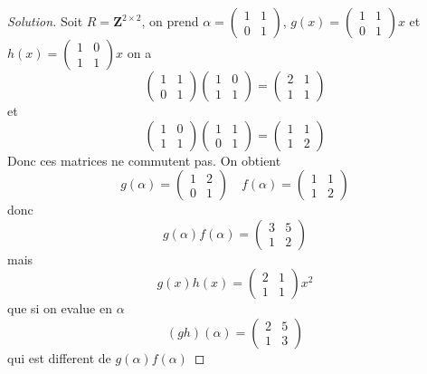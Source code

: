 \documentclass[a4paper,11pt,french]{report}
\theoremstyle{plain}
\theoremstyle{definition}
\begin{document}
\begin{proof}[Solution]
Soit $R=\mathbf{Z}^{2\times2}$, on prend $\alpha=\begin{pmatrix}1 & 1 \\ 0 & 1\end{pmatrix}$, $g(x)=\begin{pmatrix}1 & 1  \\ 0 & 1 \end{pmatrix}x$ et $h(x)=\begin{pmatrix} 1 & 0 \\ 1 & 1\end{pmatrix}x$ on a
$$
\begin{pmatrix}
1 & 1 \\
0 & 1
\end{pmatrix}\begin{pmatrix}
1 & 0 \\
1 & 1
\end{pmatrix}=\begin{pmatrix}
2 & 1 \\
1 & 1
\end{pmatrix}
$$
et 
$$
\begin{pmatrix}
1 & 0 \\
1 & 1
\end{pmatrix}\begin{pmatrix}
1 & 1 \\
0 & 1
\end{pmatrix}=\begin{pmatrix}
1 & 1 \\
1 & 2
\end{pmatrix}
$$
Donc ces matrices ne commutent pas. On obtient
$$
g(\alpha)=\begin{pmatrix}
1 & 2 \\
0 & 1
\end{pmatrix}\quad f(\alpha)=\begin{pmatrix}
1 & 1 \\
1 & 2
\end{pmatrix}
$$
donc
$$
g(\alpha)f(\alpha)=\begin{pmatrix}
3 & 5 \\
1 & 2
\end{pmatrix}
$$
mais
$$
g(x)h(x)=\begin{pmatrix}
2 & 1 \\
1 & 1 
\end{pmatrix}x^{2}
$$
que si on evalue en $\alpha$
$$
(gh)(\alpha)=\begin{pmatrix}
2 & 5 \\
1 & 3
\end{pmatrix}
$$
qui est different de $g(\alpha)f(\alpha)$
\end{proof}
\end{document}
